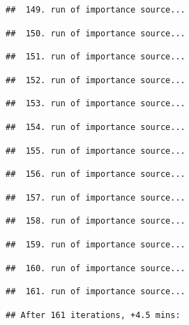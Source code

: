 \documentclass[
]{article}
\begin{document}
\begin{verbatim}
##  149. run of importance source...
\end{verbatim}

\begin{verbatim}
##  150. run of importance source...
\end{verbatim}

\begin{verbatim}
##  151. run of importance source...
\end{verbatim}

\begin{verbatim}
##  152. run of importance source...
\end{verbatim}

\begin{verbatim}
##  153. run of importance source...
\end{verbatim}

\begin{verbatim}
##  154. run of importance source...
\end{verbatim}

\begin{verbatim}
##  155. run of importance source...
\end{verbatim}

\begin{verbatim}
##  156. run of importance source...
\end{verbatim}

\begin{verbatim}
##  157. run of importance source...
\end{verbatim}

\begin{verbatim}
##  158. run of importance source...
\end{verbatim}

\begin{verbatim}
##  159. run of importance source...
\end{verbatim}

\begin{verbatim}
##  160. run of importance source...
\end{verbatim}

\begin{verbatim}
##  161. run of importance source...
\end{verbatim}

\begin{verbatim}
## After 161 iterations, +4.5 mins:
\end{verbatim}
\end{document}
